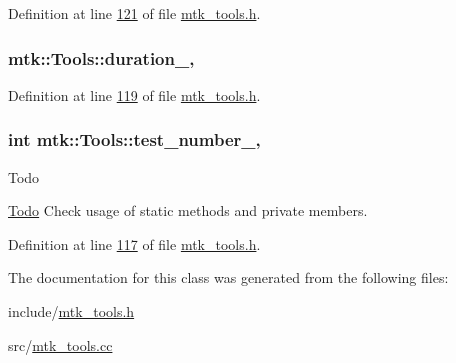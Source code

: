 Definition at line \hyperlink{mtk__tools_8h_source_l00121}{121} of file \hyperlink{mtk__tools_8h_source}{mtk\+\_\+tools.\+h}.

\hypertarget{classmtk_1_1Tools_aba9d3d2952a3de9e7b46faa86d28d692}{
\subsubsection[{duration\+\_\+}]{ mtk\+::\+Tools\+::duration\+\_\+\hspace{0.3cm}{\ttfamily [static]}, {\ttfamily [private]}}}\label{classmtk_1_1Tools_aba9d3d2952a3de9e7b46faa86d28d692}


Definition at line \hyperlink{mtk__tools_8h_source_l00119}{119} of file \hyperlink{mtk__tools_8h_source}{mtk\+\_\+tools.\+h}.

\hypertarget{classmtk_1_1Tools_a04a60458594336ee1badff79b8a9a77f}{
\subsubsection[{test\+\_\+number\+\_\+}]{\setlength{\rightskip}{0pt plus 5cm}int mtk\+::\+Tools\+::test\+\_\+number\+\_\+\hspace{0.3cm}{\ttfamily [static]}, {\ttfamily [private]}}}\label{classmtk_1_1Tools_a04a60458594336ee1badff79b8a9a77f}
\begin{DoxyRefDesc}{Todo}
\item[\hyperlink{todo__todo000026}{Todo}]Check usage of static methods and private members. \end{DoxyRefDesc}


Definition at line \hyperlink{mtk__tools_8h_source_l00117}{117} of file \hyperlink{mtk__tools_8h_source}{mtk\+\_\+tools.\+h}.



The documentation for this class was generated from the following files\+:\begin{DoxyCompactItemize}
\item 
include/\hyperlink{mtk__tools_8h}{mtk\+\_\+tools.\+h}\item 
src/\hyperlink{mtk__tools_8cc}{mtk\+\_\+tools.\+cc}\end{DoxyCompactItemize}

